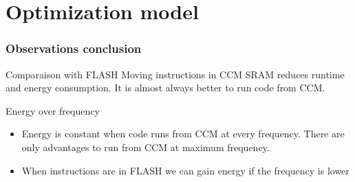 \documentclass[
	11pt, %
]{beamer}
\begin{document}
\section{Optimization model}

\begin{frame}
	\frametitle{Observations conclusion}
	\begin{block}{Comparaison with FLASH} %
		Moving instructions in CCM SRAM reduces runtime and energy consumption.
		It is almost always better to run code from CCM.
	\end{block}
	\begin{block}{Energy over frequency} %
		\begin{itemize}
			\item Energy is constant when code runs from CCM at every frequency. There are
			only advantages to run from CCM at maximum frequency.
			\item When instructions are in FLASH we can gain energy if the
			frequency is lower
		\end{itemize}
	\end{block}
\end{frame}
\end{document}
